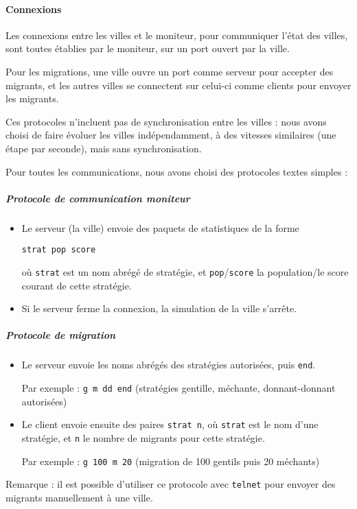 \documentclass[10pt]{article}
\begin{document}
\paragraph{Connexions}
Les connexions entre les villes et le moniteur, pour communiquer l'état des villes,
sont toutes établies par le moniteur, sur un port ouvert par la ville.

Pour les migrations, une ville ouvre un port comme serveur pour accepter des migrants, 
et les autres villes se connectent sur celui-ci comme clients pour envoyer les migrants.

Ces protocoles n'incluent pas de synchronisation entre les villes :
nous avons choisi de faire évoluer les villes indépendamment, à des vitesses similaires
(une étape par seconde), mais sans synchronisation.

Pour toutes les communications, nous avons choisi des protocoles textes simples :

\subparagraph{Protocole de communication moniteur}
\begin{itemize}
\item Le serveur (la ville) envoie des paquets de statistiques de la forme
      
      \verb|strat pop score|
      
      où \verb|strat| est un nom abrégé de stratégie, et \verb|pop|/\verb|score|
      la population/le score courant de cette stratégie.
\item Si le serveur ferme la connexion, la simulation de la ville s'arrête.
\end{itemize}

\subparagraph{Protocole de migration}
\begin{itemize}
\item Le serveur envoie les noms abrégés des stratégies autorisées, puis \verb|end|.

      Par exemple : \verb|g m dd end| (stratégies gentille, méchante, donnant-donnant autorisées)
\item Le client envoie ensuite des paires \verb|strat n|, où \verb|strat| est le nom d'une stratégie,
      et \verb|n| le nombre de migrants pour cette stratégie.

      Par exemple : \verb|g 100 m 20| (migration de 100 gentils puis 20 méchants)
\end{itemize}
Remarque : il est possible d'utiliser ce protocole avec \verb|telnet| 
pour envoyer des migrants manuellement à une ville.

\clearpage
\appendix
\end{document}
